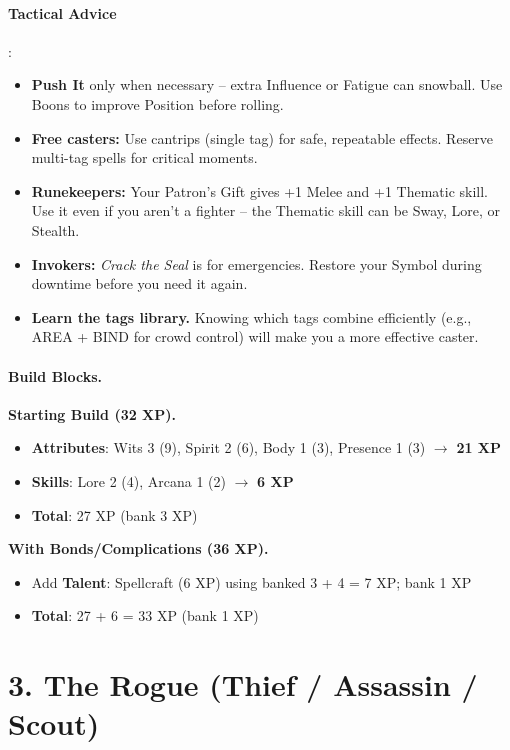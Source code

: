 \paragraph{Tactical Advice}:
\begin{itemize}
\item \textbf{Push It} only when necessary -- extra Influence or Fatigue can snowball. Use Boons to improve Position before rolling.
\item \textbf{Free casters:} Use cantrips (single tag) for safe, repeatable effects. Reserve multi-tag spells for critical moments.
\item \textbf{Runekeepers:} Your Patron's Gift gives +1 Melee and +1 Thematic skill. Use it even if you aren't a fighter -- the Thematic skill can be Sway, Lore, or Stealth.
\item \textbf{Invokers:} \emph{Crack the Seal} is for emergencies. Restore your Symbol during downtime before you need it again.
\item \textbf{Learn the tags library.} Knowing which tags combine efficiently (e.g., AREA + BIND for crowd control) will make you a more effective caster.
\end{itemize}

\paragraph{Build Blocks.}
\textbf{Starting Build (32 XP).}
\begin{itemize}
\item \textbf{Attributes}: Wits 3 (9), Spirit 2 (6), Body 1 (3), Presence 1 (3) \(\rightarrow\) \textbf{21 XP}
\item \textbf{Skills}: Lore 2 (4), Arcana 1 (2) \(\rightarrow\) \textbf{6 XP}
\item \textbf{Total}: 27 XP (bank 3 XP)
\end{itemize}
\textbf{With Bonds/Complications (36 XP).}
\begin{itemize}
\item Add \textbf{Talent}: Spellcraft (6 XP) using banked 3 + 4 = 7 XP; bank 1 XP
\item \textbf{Total}: 27 + 6 = 33 XP (bank 1 XP)
\end{itemize}

\section{3. The Rogue (Thief / Assassin / Scout)}
\label{sec:concept-rogue}

